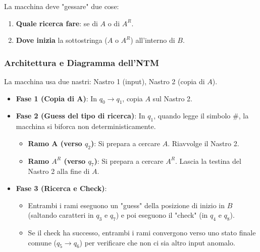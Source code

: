 \documentclass[a4paper]{article}
\begin{document}
La macchina deve "gessare" due cose:
\begin{enumerate}
    \item \textbf{Quale ricerca fare}: se di $A$ o di $A^R$.
    \item \textbf{Dove inizia} la sottostringa ($A$ o $A^R$) all'interno di $B$.
\end{enumerate}

\subsubsection{Architettura e Diagramma dell'NTM}
La macchina usa due nastri: Nastro 1 (input), Nastro 2 (copia di $A$).
\begin{itemize}
    \item \textbf{Fase 1 (Copia di A)}: In $q_0 \to q_1$, copia $A$ sul Nastro 2.
    \item \textbf{Fase 2 (Guess del tipo di ricerca)}: In $q_1$, quando legge il simbolo $\#$, la macchina si biforca non deterministicamente.
        \begin{itemize}
            \item \textbf{Ramo A (verso $q_2$)}: Si prepara a cercare $A$. Riavvolge il Nastro 2.
            \item \textbf{Ramo $A^R$ (verso $q_7$)}: Si prepara a cercare $A^R$. Lascia la testina del Nastro 2 alla fine di $A$.
        \end{itemize}
    \item \textbf{Fase 3 (Ricerca e Check)}:
        \begin{itemize}
            \item Entrambi i rami eseguono un "guess" della posizione di inizio in $B$ (saltando caratteri in $q_3$ e $q_7$) e poi eseguono il "check" (in $q_4$ e $q_8$).
            \item Se il check ha successo, entrambi i rami convergono verso uno stato finale comune ($q_5 \to q_6$) per verificare che non ci sia altro input anomalo.
        \end{itemize}
\end{itemize}
\end{document}
